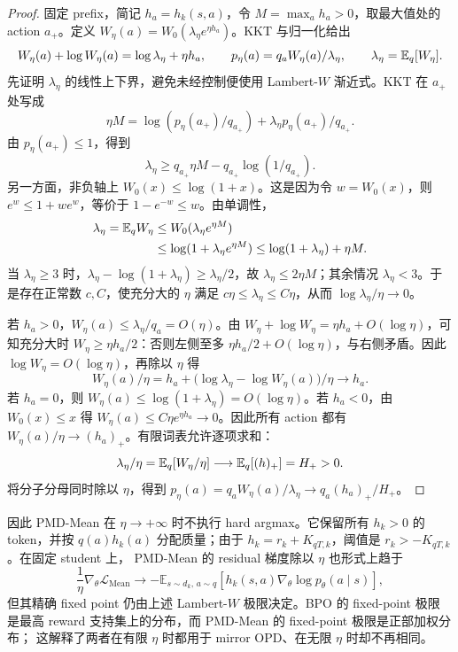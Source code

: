 \begin{proof}
固定 prefix，简记 $h_a=h_k(s,a)$，令 $M=\max_a h_a>0$，取最大值处的 action $a_+$。定义 $W_\eta(a)=W_0(\lambda_\eta e^{\eta h_a})$。KKT 与归一化给出
\begin{equation}
W_\eta(a)+\log W_\eta(a)=\log\lambda_\eta+\eta h_a,\qquad
p_\eta(a)=q_aW_\eta(a)/\lambda_\eta,\qquad
\lambda_\eta=\mathbb E_q[W_\eta].
\end{equation}
先证明 $\lambda_\eta$ 的线性上下界，避免未经控制便使用 Lambert-$W$ 渐近式。KKT 在 $a_+$ 处写成
\begin{equation}
\eta M=\log(p_\eta(a_+)/q_{a_+})+\lambda_\eta p_\eta(a_+)/q_{a_+}.
\end{equation}
由 $p_\eta(a_+)\le1$，得到
\begin{equation}
\lambda_\eta\ge q_{a_+}\eta M-q_{a_+}\log(1/q_{a_+}).
\end{equation}
另一方面，非负轴上 $W_0(x)\le\log(1+x)$。这是因为令 $w=W_0(x)$，则 $e^w\le1+we^w$，等价于 $1-e^{-w}\le w$。由单调性，
\begin{align}
\lambda_\eta=\mathbb E_qW_\eta
&\le W_0(\lambda_\eta e^{\eta M})\\
&\le\log(1+\lambda_\eta e^{\eta M})
\le\log(1+\lambda_\eta)+\eta M.
\end{align}
当 $\lambda_\eta\ge3$ 时，$\lambda_\eta-\log(1+\lambda_\eta)\ge\lambda_\eta/2$，故 $\lambda_\eta\le2\eta M$；其余情况 $\lambda_\eta<3$。于是存在正常数 $c,C$，使充分大的 $\eta$ 满足 $c\eta\le\lambda_\eta\le C\eta$，从而 $\log\lambda_\eta/\eta\to0$。

若 $h_a>0$，$W_\eta(a)\le\lambda_\eta/q_a=O(\eta)$。由 $W_\eta+\log W_\eta=\eta h_a+O(\log\eta)$，可知充分大时 $W_\eta\ge\eta h_a/2$：否则左侧至多 $\eta h_a/2+O(\log\eta)$，与右侧矛盾。因此 $\log W_\eta=O(\log\eta)$，再除以 $\eta$ 得
\begin{equation}
W_\eta(a)/\eta=h_a+\bigl(\log\lambda_\eta-\log W_\eta(a)\bigr)/\eta\longrightarrow h_a.
\end{equation}
若 $h_a=0$，则 $W_\eta(a)\le\log(1+\lambda_\eta)=O(\log\eta)$。若 $h_a<0$，由 $W_0(x)\le x$ 得 $W_\eta(a)\le C\eta e^{\eta h_a}\to0$。因此所有 action 都有 $W_\eta(a)/\eta\to(h_a)_+$。有限词表允许逐项求和：
\begin{equation}
\lambda_\eta/\eta=\mathbb E_q[W_\eta/\eta]\longrightarrow\mathbb E_q[(h)_+]=H_+>0.
\end{equation}
将分子分母同时除以 $\eta$，得到 $p_\eta(a)=q_aW_\eta(a)/\lambda_\eta\to q_a(h_a)_+/H_+$。
\end{proof}

因此 PMD-Mean 在 $\eta\to+\infty$ 时不执行 hard argmax。它保留所有 $h_k>0$ 的 token，并按 $q(a)h_k(a)$ 分配质量；由于 $h_k=r_k+K_{qT,k}$，阈值是 $r_k>-K_{qT,k}$。在固定 student 上， PMD-Mean 的 residual 梯度除以 $\eta$ 也形式上趋于
\begin{equation}
\frac1\eta\nabla_\theta\mathcal L_{\mathrm{Mean}}
\longrightarrow
-\mathbb E_{s\sim d_k,\,a\sim q}
\left[h_k(s,a)\nabla_\theta\log p_\theta(a\mid s)\right],
\end{equation}
但其精确 fixed point 仍由上述 Lambert-$W$ 极限决定。BPO 的 fixed-point 极限 是最高 reward 支持集上的分布，而 PMD-Mean 的 fixed-point 极限是正部加权分布； 这解释了两者在有限 $\eta$ 时都用于 mirror OPD、在无限 $\eta$ 时却不再相同。

